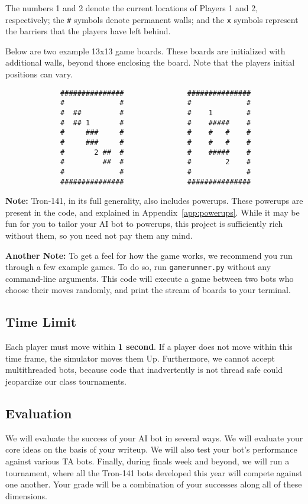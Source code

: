 \documentclass{article}
\begin{document}
\noindent
The numbers 1 and 2 denote the current locations of Players 1 and 2,
respectively; the \verb|#| symbols denote permanent walls; and the
\verb|x| symbols represent the barriers that the players have left
behind.

Below are two example 13x13 game boards.  These boards are initialized
with additional walls, beyond those enclosing the board.
Note that the players initial positions can vary.

\smallskip
\begin{verbatim}
             ###############               ###############
             #             #               #             #
             #  ##         #               #    1        #
             #  ## 1       #               #    #####    #
             #     ###     #               #    #   #    #
             #     ###     #               #    #   #    #
             #       2 ##  #               #    #####    #
             #         ##  #               #        2    #
             #             #               #             #
             ###############               ###############
\end{verbatim}
\smallskip

\textbf{Note:} Tron-141, in its full generality, also includes
powerups.  These powerups are present in the code, and explained in
Appendix~\ref{app:powerups}.  While it may be fun for you to tailor
your AI bot to powerups, this project is sufficiently rich without
them, so you need not pay them any mind.

\textbf{Another Note:} To get a feel for how the game works, we
recommend you run through a few example games.  To do so, run
\verb|gamerunner.py| without any command-line arguments.  This code
will execute a game between two bots who choose their moves
randomly, and print the stream of boards to your terminal.


\subsection{Time Limit}
Each player must move within \textbf{1 second}.
If a player does not move within this time frame,
the simulator moves them Up.
%
Furthermore, we cannot accept multithreaded bots, because code that
inadvertently is not thread safe could jeopardize our class
tournaments.


\subsection{Evaluation}
We will evaluate the success of your AI bot in several ways.  We will
evaluate your core ideas on the basis of your writeup.  We will also
test your bot's performance against various TA bots.
Finally, during finals week and beyond, we will run a tournament,
where all the Tron-141 bots developed this year will compete against
one another.  Your grade will be a combination of your successes along
all of these dimensions.
\end{document}

